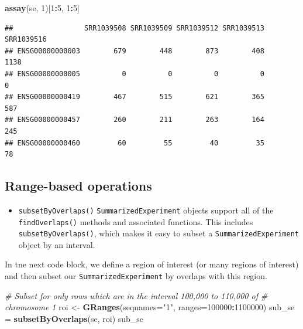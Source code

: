 \documentclass[]{article}
\newenvironment{Shaded}{\begin{snugshade}}{\end{snugshade}}
\newcommand{\CommentTok}[1]{\textcolor[rgb]{0.56,0.35,0.01}{\textit{#1}}}
\newcommand{\DataTypeTok}[1]{\textcolor[rgb]{0.13,0.29,0.53}{#1}}
\newcommand{\DecValTok}[1]{\textcolor[rgb]{0.00,0.00,0.81}{#1}}
\newcommand{\KeywordTok}[1]{\textcolor[rgb]{0.13,0.29,0.53}{\textbf{#1}}}
\newcommand{\NormalTok}[1]{#1}
\newcommand{\OperatorTok}[1]{\textcolor[rgb]{0.81,0.36,0.00}{\textbf{#1}}}
\newcommand{\StringTok}[1]{\textcolor[rgb]{0.31,0.60,0.02}{#1}}
\providecommand{\tightlist}{%
  \setlength{\itemsep}{0pt}\setlength{\parskip}{0pt}}
\begin{document}
\begin{Shaded}
\begin{Highlighting}[]
\KeywordTok{assay}\NormalTok{(se, }\DecValTok{1}\NormalTok{)[}\DecValTok{1}\OperatorTok{:}\DecValTok{5}\NormalTok{, }\DecValTok{1}\OperatorTok{:}\DecValTok{5}\NormalTok{]}
\end{Highlighting}
\end{Shaded}

\begin{verbatim}
##                 SRR1039508 SRR1039509 SRR1039512 SRR1039513 SRR1039516
## ENSG00000000003        679        448        873        408       1138
## ENSG00000000005          0          0          0          0          0
## ENSG00000000419        467        515        621        365        587
## ENSG00000000457        260        211        263        164        245
## ENSG00000000460         60         55         40         35         78
\end{verbatim}

\hypertarget{range-based-operations}{%
\subsection{Range-based operations}\label{range-based-operations}}

\begin{itemize}
\tightlist
\item
  \texttt{subsetByOverlaps()} \texttt{SummarizedExperiment} objects
  support all of the \texttt{findOverlaps()} methods and associated
  functions. This includes \texttt{subsetByOverlaps()}, which makes it
  easy to subset a \texttt{SummarizedExperiment} object by an interval.
\end{itemize}

In tne next code block, we define a region of interest (or many regions
of interest) and then subset our \texttt{SummarizedExperiment} by
overlaps with this region.

\begin{Shaded}
\begin{Highlighting}[]
\CommentTok{# Subset for only rows which are in the interval 100,000 to 110,000 of}
\CommentTok{# chromosome 1}
\NormalTok{roi <-}\StringTok{ }\KeywordTok{GRanges}\NormalTok{(}\DataTypeTok{seqnames=}\StringTok{"1"}\NormalTok{, }\DataTypeTok{ranges=}\DecValTok{100000}\OperatorTok{:}\DecValTok{1100000}\NormalTok{)}
\NormalTok{sub_se =}\StringTok{ }\KeywordTok{subsetByOverlaps}\NormalTok{(se, roi)}
\NormalTok{sub_se}
\end{Highlighting}
\end{Shaded}
\end{document}
